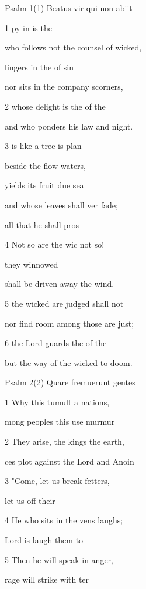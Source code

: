 Psalm 1(1) Beatus vir qui non abiit 


1 py in is the  

who follows not the counsel of  wicked, 

 lingers in the  of sin 

nor sits in the company  scorners, 

2  whose delight is the  of the  

and who ponders his law  and night. 

3  is like a tree  is plan 

beside the flow waters, 

 yields its fruit  due sea 

and whose leaves shall ver fade; 

 all that he  shall pros 

4 Not so are the wic not so! 

 they  winnowed  

shall be driven away  the wind. 

5  the wicked are judged  shall not  

nor find room among those  are just; 

6  the Lord guards the  of the  

but the way of the wicked  to doom. 

Psalm 2(2) Quare fremuerunt gentes 


1 Why this tumult a nations, 

mong peoples this use murmur 

2 They arise, the kings  the earth, 

ces plot against the Lord and  Anoin 

3 "Come, let us break  fetters, 

 let us  off their  

4 He who sits in the vens laughs; 

 Lord is laugh them to  

5 Then he will speak in  anger, 

 rage will strike  with ter 


